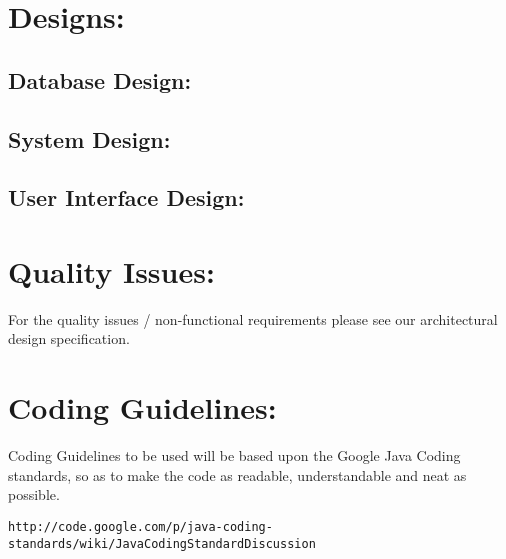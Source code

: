 \documentclass[12pt]{article}
\begin{document}
\newpage
\section{Designs:}
\subsection{Database Design:}

\subsection{System Design:}

\subsection{User Interface Design:}

\section{Quality Issues:}
For the quality issues / non-functional requirements please see our architectural design specification.

\section{Coding Guidelines:}
Coding Guidelines to be used will be based upon the Google Java Coding standards, so as to make the code as readable, understandable and neat as possible.
\begin{verbatim}
http://code.google.com/p/java-coding-standards/wiki/JavaCodingStandardDiscussion
\end{verbatim}
\end{document}
